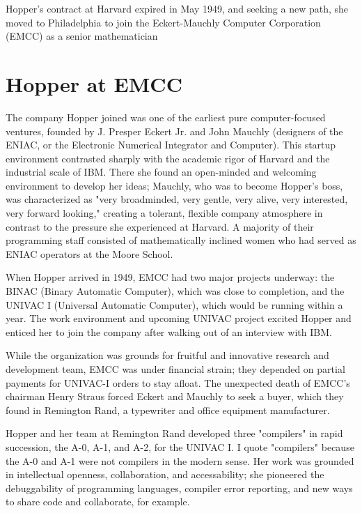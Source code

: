 Hopper's contract at Harvard expired in May 1949, and seeking a new path, she 
moved to Philadelphia to join the Eckert-Mauchly Computer Corporation (EMCC) as 
a senior mathematician

\section{Hopper at EMCC}

The company Hopper joined was one of the earliest pure computer-focused ventures,
founded by J. Presper Eckert Jr. and John Mauchly
(designers of the ENIAC, or the Electronic Numerical Integrator and Computer).
This startup environment contrasted sharply with the academic rigor of Harvard and the industrial scale of IBM.
There she found an open-minded and welcoming environment to develop her ideas;
Mauchly, who was to become Hopper's boss, was characterized as 
"very broadminded, very gentle, very alive, very interested, very forward looking,"\cite{grace_hopper_and_the_invention_of_the_information_age_2009}
creating a tolerant, flexible company atmosphere in contrast to the pressure she experienced at Harvard.
A majority of their programming staff consisted of mathematically inclined women
who had served as ENIAC operators at the Moore School.

When Hopper arrived in 1949, EMCC had two major projects underway:
the BINAC (Binary Automatic Computer), which was close to completion,
and the UNIVAC I (Universal Automatic Computer), which would be running within a year.
The work environment and upcoming UNIVAC project excited Hopper and enticed her to join the company
after walking out of an interview with IBM.

While the organization was grounds for fruitful and innovative research and development team,
EMCC was under financial strain; they depended on partial payments for UNIVAC-I orders to stay afloat.
The unexpected death of EMCC's chairman Henry Straus forced Eckert and Mauchly to seek a buyer,
which they found in Remington Rand, a typewriter and office equipment manufacturer.


Hopper and her team at Remington Rand developed three "compilers"
in rapid succession, the A-0, A-1, and A-2, for the UNIVAC I.
I quote "compilers" because the A-0 and A-1 were not compilers in the modern sense.
Her work was grounded in intellectual openness, collaboration, and accessability;
she pioneered the debuggability of programming languages, compiler error reporting,
and new ways to share code and collaborate, for example.

